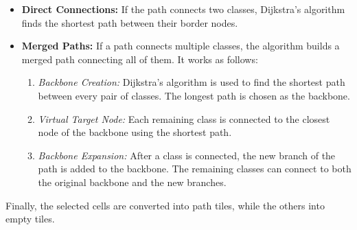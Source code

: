 \documentclass[../../main.tex]{subfiles}
\begin{document}
\begin{itemize}

\item \textbf{Direct Connections:} If the path connects two classes, Dijkstra's algorithm finds the shortest path between their border nodes.

\item \textbf{Merged Paths:} If a path connects multiple classes, the algorithm builds a merged path connecting all of them. It works as follows:

    \begin{enumerate}
        \item \textit{Backbone Creation:} Dijkstra's algorithm is used to find the shortest path between every pair of classes. The longest path is chosen as the backbone.
        \item \textit{Virtual Target Node:} Each remaining class is connected to the closest node of the backbone using the shortest path.
        \item \textit{Backbone Expansion:} After a class is connected, the new branch of the path is added to the backbone. The remaining classes can connect to both the original backbone and the new branches.
    \end{enumerate}

\end{itemize}

Finally, the selected cells are converted into path tiles, while the others into empty tiles.
\end{document}
